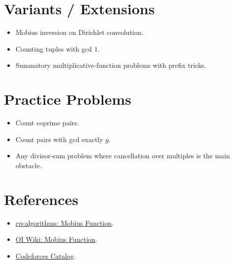 \section*{Variants / Extensions}

\begin{itemize}
  \item Mobius inversion on Dirichlet convolution.
  \item Counting tuples with gcd \(1\).
  \item Summatory multiplicative-function problems with prefix tricks.
\end{itemize}

\section*{Practice Problems}

\begin{itemize}
  \item Count coprime pairs.
  \item Count pairs with gcd exactly \(g\).
  \item Any divisor-sum problem where cancellation over multiples is the main obstacle.
\end{itemize}

\section*{References}

\begin{itemize}
  \item \href{https://cp-algorithms.com/algebra/mobius-function.html}{cp-algorithms: Mobius Function}.
  \item \href{https://oiwiki.com/math/number-theory/mobius/}{OI Wiki: Mobius Function}.
  \item \href{https://codeforces.com/catalog}{Codeforces Catalog}.
\end{itemize}
